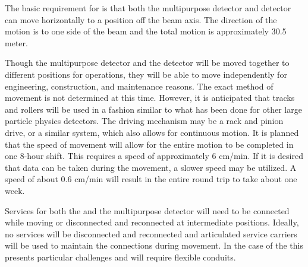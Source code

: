 The basic requirement for  is that both the multipurpose detector and  detector can move horizontally to a position off the beam axis. The direction of the motion is to one side of the beam and the total motion is approximately 30.5 meter. 

Though the multipurpose detector and the  detector will be moved together to different positions for operations, they will be able to move independently for engineering, construction, and maintenance reasons.  The exact method of movement is not determined at this time. However, it is anticipated that tracks and rollers will be used in a fashion similar to what has been done for other large particle physics detectors. The driving mechanism may be a rack and pinion drive, or a similar system, which also allows for continuous motion. 
It is planned that the speed of movement will allow for the entire motion to be completed in one 8-hour shift. This requires a speed of approximately 6 cm/min. If it is desired that data can be taken during the movement, a slower speed may be utilized. A speed of about 0.6 cm/min will result in the entire round trip to take about one week. 

Services for both the  and the multipurpose detector will need to be connected while moving or disconnected and reconnected at intermediate positions. Ideally, no services will be disconnected and reconnected and articulated service carriers will be used to maintain the connections during movement. In the case of the  this presents particular challenges and will require flexible conduits. 







